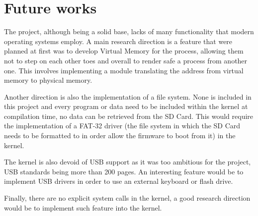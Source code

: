 \section{Future works}

The project, although being a solid base, lacks of many functionality that modern operating systems employ.
A main research direction is a feature that were planned at first was to develop Virtual Memory for the process, allowing them not to step on each other toes and overall to render safe a process from another one. This involves implementing a module translating the address from virtual memory to physical memory.

Another direction is also the implementation of a file system. None is included in this project and every program or data need to be included within the kernel at compilation time, no data can be retrieved from the SD Card. This would require the implementation of a FAT-32 driver (the file system in which the SD Card needs to be formatted to in order allow the firmware to boot from it) in the kernel.

The kernel is also devoid of USB support as it was too ambitious for the project, USB standards being more than 200 pages. An interesting feature would be to implement USB drivers in order to use an external keyboard or flash drive.

Finally, there are no explicit system calls in the kernel, a good research direction would be to implement such feature into the kernel.